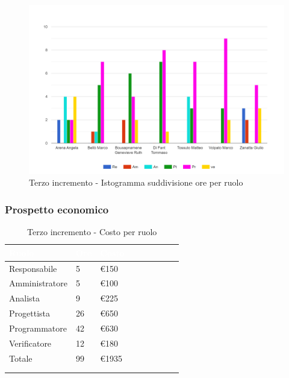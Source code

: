 {{      \begin{figure}[H]
        \includegraphics[width=15cm]{sezioni/images/terzo.png}
        \centering
        \caption{Terzo incremento - Istogramma suddivisione ore per ruolo}
     \end{figure}
    }

    \subsubsection{Prospetto economico}
    {
        \setlength{\freewidth}{\dimexpr\textwidth-30\tabcolsep}
        \renewcommand{\arraystretch}{1.0}
        \setlength{\aboverulesep}{0pt}
        \setlength{\belowrulesep}{0pt}
        \begin{longtable}{C{.4\freewidth} C{.2\freewidth} C{.2\freewidth} C{.2\freewidth} C{.2\freewidth} C{.2\freewidth} C{.2\freewidth} C{.2\freewidth} C{.2\freewidth}}
          \toprule
        \textcolor{white}{\textbf{Ruolo}}&
        \textcolor{white}{\textbf{Ore}}&
        \textcolor{white}{\textbf{Costo}}\\
        \toprule
        \endhead
            
        Responsabile  & 5 & \euro150\\
        Amministratore  & 5 & \euro100 \\
        Analista &9 & \euro225\\
        Progettista &26 & \euro650\\
        Programmatore &42 & \euro630\\
        Verificatore &12 & \euro180\\
        Totale&99&\euro1935\\
        \bottomrule
      \\
        \caption{Terzo incremento - Costo per ruolo}


\end{longtable}}}
